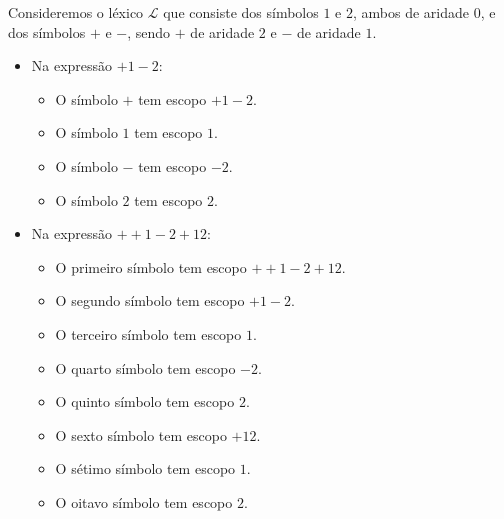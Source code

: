 \begin{example}\label{exa:escopo}
    Consideremos o léxico $\mathcal L$ que consiste dos símbolos $1$ e $2$, ambos de aridade $0$, e dos símbolos $+$ e $-$, sendo $+$ de aridade $2$ e $-$ de aridade $1$.

    \begin{itemize}
        \item Na expressão $+1-2$:
        \begin{itemize}
            \item O símbolo $+$ tem escopo $+1-2$.
            \item O símbolo $1$ tem escopo $1$.
            \item O símbolo $-$ tem escopo $-2$.
            \item O símbolo $2$ tem escopo $2$.
        \end{itemize}
    \end{itemize}
    \begin{itemize}
        \item Na expressão $++1-2+12$:
        \begin{itemize}
            \item O primeiro símbolo tem escopo $++1-2+12$.
            \item O segundo símbolo tem escopo $+1-2$.
            \item O terceiro símbolo tem escopo $1$.
            \item O quarto símbolo tem escopo $-2$.
            \item O quinto símbolo tem escopo $2$.
            \item O sexto símbolo tem escopo $+12$.
            \item O sétimo símbolo tem escopo $1$.
            \item O oitavo símbolo tem escopo $2$.
        \end{itemize}
    \end{itemize}
\end{example}

